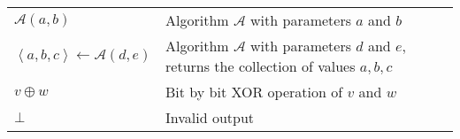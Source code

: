 \documentclass[master=eelt,masteroption=em]{kulemt}
\theoremstyle{plain}
\theoremstyle{definition}
\begin{document}
\begin{flushleft}
 \renewcommand{\arraystretch}{1.1}
 \begin{tabularx}{\textwidth}{@{}p{30mm}X@{}}
  $\mathcal{A} \left( a, b \right)$ & Algorithm $\mathcal{A}$ with parameters $a$ and $b$ \\
  $\left< a, b, c \right> \leftarrow \mathcal{A}( d, e )$ & Algorithm $\mathcal{A}$ with parameters $d$ and $e$, returns the collection of values $a, b, c$ \\
  $v \oplus w$ & Bit by bit XOR operation of $v$ and $w$ \\
  $\bot$ & Invalid output \\
  \end{tabularx}
\end{flushleft}

\mainmatter








\appendixpage*          %
\appendix

%



\backmatter


\end{document}

